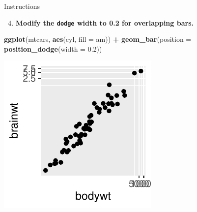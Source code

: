 \documentclass[
  ignorenonframetext,
]{beamer}
\newenvironment{Shaded}{\begin{snugshade}}{\end{snugshade}}
\newcommand{\AttributeTok}[1]{\textcolor[rgb]{0.13,0.29,0.53}{#1}}
\newcommand{\FloatTok}[1]{\textcolor[rgb]{0.00,0.00,0.81}{#1}}
\newcommand{\FunctionTok}[1]{\textcolor[rgb]{0.13,0.29,0.53}{\textbf{#1}}}
\newcommand{\NormalTok}[1]{#1}
\newcommand{\SpecialCharTok}[1]{\textcolor[rgb]{0.81,0.36,0.00}{\textbf{#1}}}
\providecommand{\tightlist}{%
  \setlength{\itemsep}{0pt}\setlength{\parskip}{0pt}}
\begin{document}
\begin{frame}[fragile]{Instructions}
\label{instructions-6}
\begin{enumerate}
\setcounter{enumi}{3}
\tightlist
\item
  \textbf{Modify the \texttt{dodge} width to 0.2 for overlapping bars.}
\end{enumerate}


\begin{Shaded}
\begin{Highlighting}[]
\FunctionTok{ggplot}\NormalTok{(mtcars, }\FunctionTok{aes}\NormalTok{(cyl, }\AttributeTok{fill =}\NormalTok{ am)) }\SpecialCharTok{+} \FunctionTok{geom\_bar}\NormalTok{(}\AttributeTok{position =} \FunctionTok{position\_dodge}\NormalTok{(}\AttributeTok{width =} \FloatTok{0.2}\NormalTok{))}
\end{Highlighting}
\end{Shaded}

\begin{center}\includegraphics[width=0.5\linewidth]{Figs/unnamed-chunk-50-1} \end{center}
\end{frame}
\end{document}
